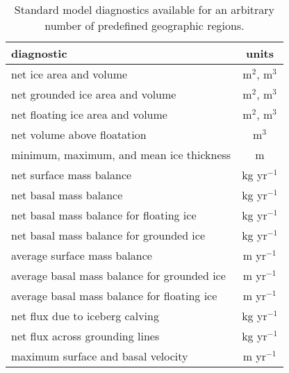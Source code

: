 \begin{table*}[t]
\caption{Standard model diagnostics available for an arbitrary number of predefined geographic regions.
}
\centering
\begin{tabular}{lc}
\hline
diagnostic & units \\
\hline
net ice area and volume & m$^2$, m$^3$ \\
net grounded ice area and volume & m$^2$, m$^3$ \\
net floating ice area and volume & m$^2$, m$^3$ \\
net volume above floatation & m$^3$ \\
minimum, maximum, and mean ice thickness & m \\
net surface mass balance & kg yr$^{-1}$ \\
net basal mass balance & kg yr$^{-1}$ \\
net basal mass balance for floating ice & kg yr$^{-1}$ \\
net basal mass balance for grounded ice & kg yr$^{-1}$ \\
average surface mass balance & m yr$^{-1}$ \\
average basal mass balance for grounded ice & m yr$^{-1}$ \\
average basal mass balance for floating ice & m yr$^{-1}$ \\
net flux due to iceberg calving & kg yr$^{-1}$ \\
net flux across grounding lines & kg yr$^{-1}$ \\
maximum surface and basal velocity & m yr$^{-1}$ \\
\hline
\end{tabular}
\label{table:analysisVars}
\end{table*}


